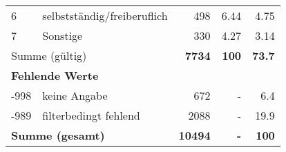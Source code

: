 \begin{longtable}{lXrrr}
     6 &
     \multicolumn{1}{X}{ selbstständig/freiberuflich   } &


       \num{498} &
       \num[round-mode=places,round-precision=2]{6.44} &
         \num[round-mode=places,round-precision=2]{4.75} \\

     7 &
     \multicolumn{1}{X}{ Sonstige   } &


       \num{330} &
       \num[round-mode=places,round-precision=2]{4.27} &
         \num[round-mode=places,round-precision=2]{3.14} \\
     \midrule
     \multicolumn{2}{l}{Summe (gültig)} &
       \textbf{\num{7734}} &
     \textbf{\num{100}} &
       \textbf{\num[round-mode=places,round-precision=2]{73.7}} \\
     \multicolumn{5}{l}{\textbf{Fehlende Werte}}\\
       -998 &
       keine Angabe &
         \num{672} &
        - &
         \num[round-mode=places,round-precision=2]{6.4} \\
       -989 &
       filterbedingt fehlend &
         \num{2088} &
        - &
         \num[round-mode=places,round-precision=2]{19.9} \\
     \midrule
     \multicolumn{2}{l}{\textbf{Summe (gesamt)}} &
          \textbf{\num{10494}} &
        \textbf{-} &
        \textbf{\num{100}} \\
     \bottomrule
     \end{longtable}
     
